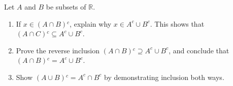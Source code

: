\documentclass[class=understanding-analysis,crop=false]{standalone}
\begin{document}
\begin{exercise}\label{chapter1:section2:de-morgan-law}
    \par Let $A$ and $B$ be subsets of $\mathbb{R}$.
    \begin{enumerate}[label = (\alph*)]
        \item If $x\in (A\cap B){}^{c}$, explain why $x\in A^{c}\cup B^{c}$. This shows that $(A\cap C){}^{c} \subseteq A^{c}\cup B^{c}$.
        \item Prove the reverse inclusion $(A\cap B){}^{c}\supseteq A^{c}\cup B^{c}$, and conclude that $(A\cap B){}^{c} = A^{c}\cup B^{c}$.
        \item Show $(A\cup B){}^{c} = A^{c}\cap B^{c}$ by demonstrating inclusion both ways.
    \end{enumerate}
\end{exercise}
\end{document}
